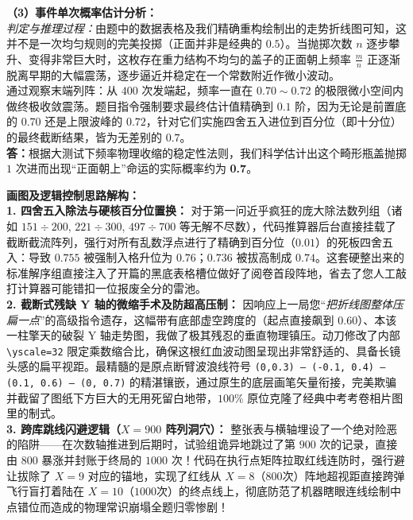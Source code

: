 \vspace{0.4cm}
\textbf{（3）事件单次概率估计分析：} \\
\textit{判定与推理过程：}由题中的数据表格及我们精确重构绘制出的走势折线图可知，这并不是一次均匀规则的完美投掷（正面并非是经典的 $0.5$）。当抛掷次数 $n$ 逐步攀升、变得非常巨大时，这枚存在重力结构不均匀的盖子的正面朝上频率 $\frac{m}{n}$ 正逐渐脱离早期的大幅震荡，逐步逼近并稳定在一个常数附近作微小波动。\\
通过观察末端列阵：从 $400$ 次发端起，频率一直在 $0.70 \sim 0.72$ 的极限微小空间内做终极收敛震荡。题目指令强制要求最终估计值精确到 $0.1$ 阶，因为无论是前置底的 $0.70$ 还是上限波峰的 $0.72$，针对它们实施四舍五入进位到百分位（即十分位）的最终截断结果，皆为无差别的 $0.7$。
\\
\textbf{答：}根据大测试下频率物理收缩的稳定性法则，我们科学估计出这个畸形瓶盖抛掷 $1$ 次进而出现“正面朝上”命运的实际概率约为 \textbf{0.7}。

\vspace{0.4cm}
{\small\color{blue!70!black}
\textbf{画图及逻辑控制思路解构：}\\
\textbf{1. 四舍五入除法与硬核百分位置换：} 对于第一问近乎疯狂的庞大除法数列组（诸如 $151 \div 200$, $221 \div 300$, $497 \div 700$ 等无解不尽数），代码推算器后台直接挂载了截断截流阵列，强行对所有乱数浮点进行了精确到百分位（$0.01$）的死板四舍五入：导致 $0.755$ 被强制入格升位为 $0.76$；$0.736$ 被拔高制成 $0.74$。这套硬整出来的标准解序组直接注入了开篇的黑底表格槽位做好了阅卷首段阵地，省去了您人工敲打计算器可能错扣一位报废全分的雷池。\\
\textbf{2. 截断式残缺 Y 轴的微缩手术及防超高压制：} 因响应上一局您“\textit{把折线图整体压扁一点}”的高级指令遗存，这幅带有底部虚空跨度的（起点直接飙到 $0.60$）、本该一柱擎天的破裂 Y 轴走势图，我做了极其残忍的垂直物理镇压。动刀修改了内部 \texttt{\textbackslash{}yscale=32} 限定乘数缩合比，确保这根红血波动图呈现出非常舒适的、具备长镜头感的扁平视距。最精髓的是原点断臂波浪线符号 \texttt{(0,0.3) -- (-0.1, 0.4) -- (0.1, 0.6) -- (0, 0.7)} 的精湛镶嵌，通过原生的底层画笔矢量衔接，完美欺骗并截留了图纸下方巨大的无用死留白地带，$100\%$ 原位克隆了经典中考考卷相片图里的制式。\\
\textbf{3. 跨库跳线闪避逻辑（$X=900$ 阵列洞穴）：} 整张表与横轴埋设了一个绝对险恶的陷阱——在次数轴推进到后期时，试验组诡异地跳过了第 $900$ 次的记录，直接由 $800$ 暴涨并封账于终局的 $1000$ 次！代码在执行点矩阵拉取红线连防时，强行避让拔除了 $X=9$ 对应的锚地，实现了红线从 $X=8$（$800$次）阵地超视距直接跨弹飞行盲打着陆在 $X=10$（$1000$次）的终点线上，彻底防范了机器瞎眼连线绘制中点错位而造成的物理常识崩塌全题归零惨剧！
}


